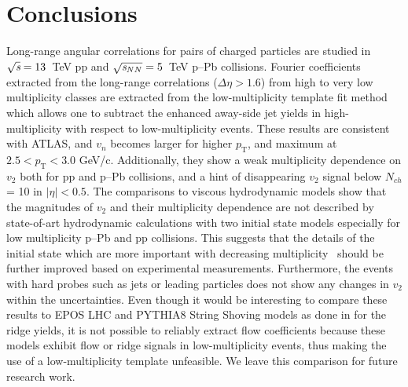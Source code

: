 
\section{Conclusions}
\label{sec:summary}
Long-range angular correlations for pairs of charged particles are studied in ${\sqrt{{\textit s}}}=13$~TeV pp and ${\sqrt{{\textit s_{NN}}}}=5$~TeV p--Pb collisions. Fourier coefficients extracted from the long-range correlations ($\Delta\eta > 1.6$) from high to very low multiplicity classes are extracted from the low-multiplicity template fit method which allows one to subtract the enhanced away-side jet yields in high-multiplicity with respect to low-multiplicity events.
These results are consistent with ATLAS, and $v_n$ becomes larger for higher $p_\mathrm{T}$, and maximum at $2.5<p_\mathrm{T}<3.0$ GeV/c. 
Additionally, they show a weak multiplicity dependence on $v_2$ both for pp and p--Pb collisions, and a hint of disappearing $v_2$ signal below $N_{ch}$ = 10 in $|\eta|<0.5$. 
The comparisons to viscous hydrodynamic models show that the magnitudes of $v_2$ and their multiplicity dependence are not described by state-of-art hydrodynamic calculations with two initial state models especially for low multiplicity p--Pb and pp collisions. This suggests that the details of the initial state which are more important with decreasing multiplicity~\cite{Greif:2017bnr,Moreland:2018gsh} should be further improved based on experimental measurements. 
Furthermore, the events with hard probes such as jets or leading particles does not show any changes in $v_2$ within the uncertainties. 
Even though it would be interesting to compare these results to EPOS LHC and PYTHIA8 String Shoving models as done in \cite{ALICE:2012eyl} for the ridge yields, it is not possible to reliably extract flow coefficients because these models exhibit flow or ridge signals in low-multiplicity events, thus making the use of a low-multiplicity template unfeasible. We leave this comparison for future research work.

